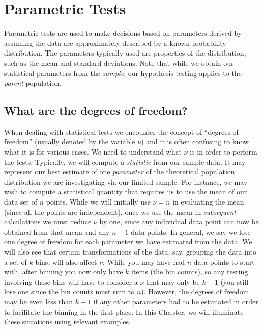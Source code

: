 \section{Parametric Tests}

Parametric tests are used to make decisions based on parameters derived by assuming the data are
approximately described by a known probability distribution.  The parameters typically used
are properties of the distribution, such as the mean and standard deviations.  Note that while we obtain our statistical parameters
from the \emph{sample}, our hypothesis testing applies to the \emph{parent} population.

\subsection{What are the degrees of freedom?}
\label{sec:freedom}
When dealing with statistical tests we encounter the concept of ``degrees of freedom'' (usually
denoted by the variable $\nu$) and it is
often confusing to know what it is for various cases.  We need to understand what $\nu$ is in
order to perform the tests.  Typically, we will compute a \emph{statistic} from our sample data.
It may represent our best estimate of one \emph{parameter} of the theoretical population distribution we are
investigating via our limited sample.  For instance, we may wish to compute a statistical quantity that requires
us to use the mean of our data set of $n$ points.  While we will initially use $\nu = n$ in evaluating the mean
(since all the points are independent), once we use
the mean in \emph{subsequent} calculations we must reduce $\nu$ by one, since any individual data point can
now be obtained from that mean and any $n-1$ data points.  In general, we say we lose one degree of
freedom for each parameter we have estimated from the data.  We will also see that certain transformations
of the data, say, grouping the data into a set of $k$ bins, will also affect $\nu$.  While you may have had
$n$ data points to start with, after binning you now only have $k$ items (the bin counts), so any testing involving these bins
will have to consider a $\nu$ that may only be $k-1$ (you still lose one since the bin counts must sum to $n$).  However,
the degrees of freedom may be even less than $k-1$ if any other parameters had to be estimated in order to
facilitate the binning in the first place.  In this Chapter, we will illuminate these situations using relevant examples.

